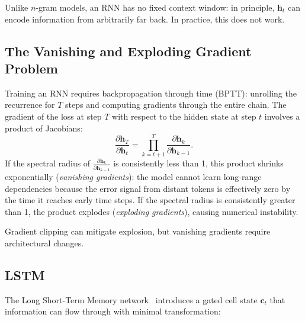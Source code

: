 Unlike $n$-gram models, an RNN has no fixed context window: in principle, $\mathbf{h}_t$ can encode information from arbitrarily far back. In practice, this does not work.

\subsection{The Vanishing and Exploding Gradient Problem}

Training an RNN requires backpropagation through time (BPTT): unrolling the recurrence for $T$ steps and computing gradients through the entire chain. The gradient of the loss at step $T$ with respect to the hidden state at step $t$ involves a product of Jacobians:
\[
\frac{\partial \mathbf{h}_T}{\partial \mathbf{h}_t} = \prod_{k=t+1}^{T} \frac{\partial \mathbf{h}_k}{\partial \mathbf{h}_{k-1}}.
\]
If the spectral radius of $\frac{\partial \mathbf{h}_k}{\partial \mathbf{h}_{k-1}}$ is consistently less than 1, this product shrinks exponentially (\emph{vanishing gradients}): the model cannot learn long-range dependencies because the error signal from distant tokens is effectively zero by the time it reaches early time steps. If the spectral radius is consistently greater than 1, the product explodes (\emph{exploding gradients}), causing numerical instability.

Gradient clipping can mitigate explosion, but vanishing gradients require architectural changes.

\medskip
\noindent{}
\medskip

\subsection{LSTM}

The Long Short-Term Memory network~\cite{hochreiter1997lstm} introduces a gated cell state $\mathbf{c}_t$ that information can flow through with minimal transformation:

